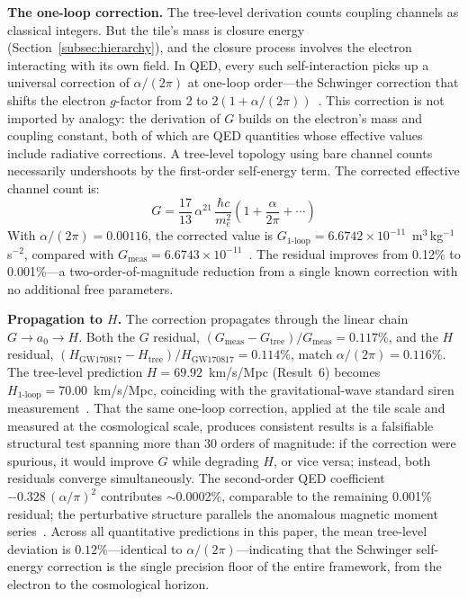 \documentclass[aps,prd,preprint,superscriptaddress,showpacs,preprintnumbers,amsmath,amssymb,nofootinbib]{revtex4-2}
\begin{document}
\textbf{The one-loop correction.} The tree-level derivation counts coupling channels as classical integers. But the tile's mass is closure energy (Section~\ref{subsec:hierarchy}), and the closure process involves the electron interacting with its own field. In QED, every such self-interaction picks up a universal correction of $\alpha/(2\pi)$ at one-loop order---the Schwinger correction that shifts the electron $g$-factor from 2 to $2(1 + \alpha/(2\pi))$~\cite{schwinger1948}. This correction is not imported by analogy: the derivation of $G$ builds on the electron's mass and coupling constant, both of which are QED quantities whose effective values include radiative corrections. A tree-level topology using bare channel counts necessarily undershoots by the first-order self-energy term. The corrected effective channel count is:
\begin{equation}
G = \frac{17}{13}\,\alpha^{21}\,\frac{\hbar c}{m_e^2}\left(1 + \frac{\alpha}{2\pi} + \cdots\right)
\label{eq:G-oneloop}
\end{equation}
With $\alpha/(2\pi) = 0.00116$, the corrected value is $G_{1\text{-loop}} = 6.6742 \times 10^{-11}$~m$^3$\,kg$^{-1}$\,s$^{-2}$, compared with $G_{\text{meas}} = 6.6743 \times 10^{-11}$~\cite{codata2022}. The residual improves from 0.12\% to 0.001\%---a two-order-of-magnitude reduction from a single known correction with no additional free parameters.

\textbf{Propagation to $H$.} The correction propagates through the linear chain $G \to a_0 \to H$. Both the $G$ residual, $(G_{\text{meas}} - G_{\text{tree}})/G_{\text{meas}} = 0.117\%$, and the $H$ residual, $(H_{\text{GW170817}} - H_{\text{tree}})/H_{\text{GW170817}} = 0.114\%$, match $\alpha/(2\pi) = 0.116\%$. The tree-level prediction $H = 69.92$~km/s/Mpc (Result~6) becomes $H_{1\text{-loop}} = 70.00$~km/s/Mpc, coinciding with the gravitational-wave standard siren measurement~\cite{gw170817}. That the same one-loop correction, applied at the tile scale and measured at the cosmological scale, produces consistent results is a falsifiable structural test spanning more than 30 orders of magnitude: if the correction were spurious, it would improve $G$ while degrading $H$, or vice versa; instead, both residuals converge simultaneously. The second-order QED coefficient $-0.328\,(\alpha/\pi)^2$ contributes $\sim$0.0002\%, comparable to the remaining 0.001\% residual; the perturbative structure parallels the anomalous magnetic moment series~\cite{schwinger1948}. Across all quantitative predictions in this paper, the mean tree-level deviation is $0.12\%$---identical to $\alpha/(2\pi)$---indicating that the Schwinger self-energy correction is the single precision floor of the entire framework, from the electron to the cosmological horizon.
\end{document}
